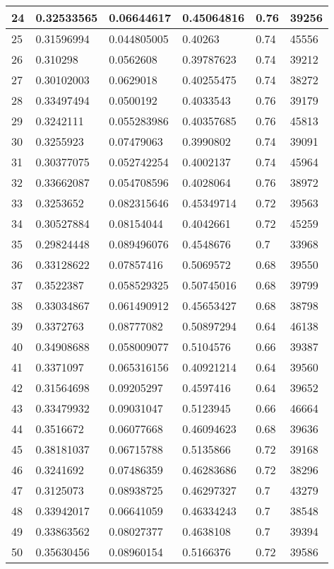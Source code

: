 \begin{longtable}{|l|l|l|l|l|l|}
24 & 0.32533565 & 0.06644617 & 0.45064816 & 0.76 & 39256 \\ \hline 
25 & 0.31596994 & 0.044805005 & 0.40263 & 0.74 & 45556 \\ \hline 
26 & 0.310298 & 0.0562608 & 0.39787623 & 0.74 & 39212 \\ \hline 
27 & 0.30102003 & 0.0629018 & 0.40255475 & 0.74 & 38272 \\ \hline 
28 & 0.33497494 & 0.0500192 & 0.4033543 & 0.76 & 39179 \\ \hline 
29 & 0.3242111 & 0.055283986 & 0.40357685 & 0.76 & 45813 \\ \hline 
30 & 0.3255923 & 0.07479063 & 0.3990802 & 0.74 & 39091 \\ \hline 
31 & 0.30377075 & 0.052742254 & 0.4002137 & 0.74 & 45964 \\ \hline 
32 & 0.33662087 & 0.054708596 & 0.4028064 & 0.76 & 38972 \\ \hline 
33 & 0.3253652 & 0.082315646 & 0.45349714 & 0.72 & 39563 \\ \hline 
34 & 0.30527884 & 0.08154044 & 0.4042661 & 0.72 & 45259 \\ \hline 
35 & 0.29824448 & 0.089496076 & 0.4548676 & 0.7 & 33968 \\ \hline 
36 & 0.33128622 & 0.07857416 & 0.5069572 & 0.68 & 39550 \\ \hline 
37 & 0.3522387 & 0.058529325 & 0.50745016 & 0.68 & 39799 \\ \hline 
38 & 0.33034867 & 0.061490912 & 0.45653427 & 0.68 & 38798 \\ \hline 
39 & 0.3372763 & 0.08777082 & 0.50897294 & 0.64 & 46138 \\ \hline 
40 & 0.34908688 & 0.058009077 & 0.5104576 & 0.66 & 39387 \\ \hline 
41 & 0.3371097 & 0.065316156 & 0.40921214 & 0.64 & 39560 \\ \hline 
42 & 0.31564698 & 0.09205297 & 0.4597416 & 0.64 & 39652 \\ \hline 
43 & 0.33479932 & 0.09031047 & 0.5123945 & 0.66 & 46664 \\ \hline 
44 & 0.3516672 & 0.06077668 & 0.46094623 & 0.68 & 39636 \\ \hline 
45 & 0.38181037 & 0.06715788 & 0.5135866 & 0.72 & 39168 \\ \hline 
46 & 0.3241692 & 0.07486359 & 0.46283686 & 0.72 & 38296 \\ \hline 
47 & 0.3125073 & 0.08938725 & 0.46297327 & 0.7 & 43279 \\ \hline 
48 & 0.33942017 & 0.06641059 & 0.46334243 & 0.7 & 38548 \\ \hline 
49 & 0.33863562 & 0.08027377 & 0.4638108 & 0.7 & 39394 \\ \hline 
50 & 0.35630456 & 0.08960154 & 0.5166376 & 0.72 & 39586 \\ \hline 
\end{longtable}